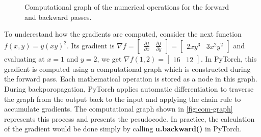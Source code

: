 \begin{figure}[H]
    \centering
    
    \caption{Computational graph of the numerical operations for the forward and backward passes.}
    \label{fig:com-graph}
\end{figure}


To underestand how the gradients are computed, consider the next function $f(x, y) = y(xy)^2$. Its gradient is
 $\nabla f = \begin{bmatrix}
    \frac{\partial f}{\partial x} & \frac{\partial f}{\partial y}
\end{bmatrix} = \begin{bmatrix}
    2xy^3 & 3x^2y^2
\end{bmatrix}$ and evaluating at $x=1$ and $y=2$, we get $\nabla f(1,2) = \begin{bmatrix}
    16 & 12
\end{bmatrix}$.
In PyTorch, this gradient is computed using a computational graph which is constructed during the forward pass.
Each mathematical operation is stored as a node in this graph.
During backporopagation, PyTorch applies automatic differentiation to traverse the graph from the output back to the input and applying the chain rule to accumulate gradients.
The computational graph shown in \autoref{fig:com-graph} represents this process and  presents the pesudocode.
In practice, the calculation of the gradient would be done simply by calling \textbf{u.backward()} in PyTorch.


